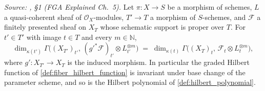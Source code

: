 \begin{lemma}\leanok
  \label{lem:hilbert_fibre_base_change}
  \textit{Source: \cite{nitsure-hilbert-quot}, \S 1 (FGA Explained Ch.~5).}
  Let \(\pi : X \to S\) be a morphism of schemes, \(L\) a quasi-coherent
  sheaf of \(\mathcal{O}_X\)-modules, \(T' \to T\) a morphism of
  \(S\)-schemes, and
  \(\mathcal{F}\) a finitely presented sheaf on \(X_T\) whose schematic
  support is proper over \(T\).  For \(t' \in T'\) with image \(t \in T\)
  and every \(m \in \mathbb{N}\),
  \[
    \dim_{\kappa(t')} \Gamma\bigl((X_{T'})_{t'},\,
      (g'^*\mathcal{F})_{t'} \otimes L_{t'}^{\otimes m}\bigr)
    \;=\;
    \dim_{\kappa(t)} \Gamma\bigl((X_T)_t,\,
      \mathcal{F}_t \otimes L_t^{\otimes m}\bigr),
  \]
  where \(g' : X_{T'} \to X_T\) is the induced morphism.  In particular the
  graded Hilbert function of \cref{def:fiber_hilbert_function} is invariant
  under base change of the parameter scheme, and so is the Hilbert polynomial
  of \cref{def:hilbert_polynomial}.
\end{lemma}
